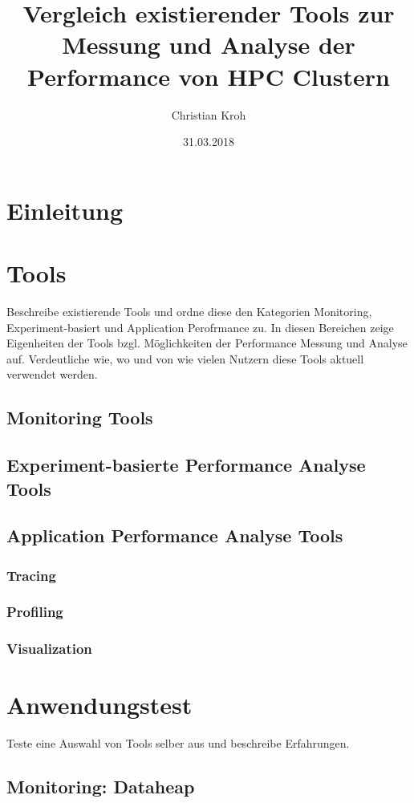 \documentclass[german,beleg,zihtitle,hyperref,utf8]{zihpub}
\title{Vergleich existierender Tools zur Messung und Analyse der Performance von HPC Clustern}
\author{Christian Kroh}
\date{31.03.2018}
\begin{document}
\chapter{Einleitung}



\chapter{Tools}
\par Beschreibe existierende Tools und ordne diese den Kategorien Monitoring, Experiment-basiert und Application Perofrmance zu. In diesen Bereichen zeige Eigenheiten der Tools bzgl. Möglichkeiten der Performance Messung und Analyse auf. Verdeutliche wie, wo und von wie vielen Nutzern diese Tools aktuell verwendet werden. 

\section{Monitoring Tools}

\section{Experiment-basierte Performance Analyse Tools}

\section{Application Performance Analyse Tools}

\subsection{Tracing}

\subsection{Profiling}

\subsection{Visualization}

\chapter{Anwendungstest}
Teste eine Auswahl von Tools selber aus und beschreibe Erfahrungen.
\section{Monitoring: Dataheap}
\end{document}
